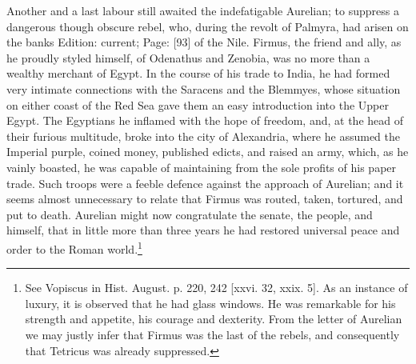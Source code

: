 Another and a last labour still awaited the indefatigable Aurelian; to suppress a dangerous though obscure rebel, who, during the revolt of Palmyra, had arisen on the banks Edition: current; Page: [93] of the Nile. Firmus, the friend and ally, as he proudly styled himself, of Odenathus and Zenobia, was no more than a wealthy merchant of Egypt. In the course of his trade to India, he had formed very intimate connections with the Saracens and the Blemmyes, whose situation on either coast of the Red Sea gave them an easy introduction into the Upper Egypt. The Egyptians he inflamed with the hope of freedom, and, at the head of their furious multitude, broke into the city of Alexandria, where he assumed the Imperial purple, coined money, published edicts, and raised an army, which, as he vainly boasted, he was capable of maintaining from the sole profits of his paper trade. Such troops were a feeble defence against the approach of Aurelian; and it seems almost unnecessary to relate that Firmus was routed, taken, tortured, and put to death. Aurelian might now congratulate the senate, the people, and himself, that in little more than three years he had restored universal peace and order to the Roman world.\footnote{See Vopiscus in Hist. August. p. 220, 242 [xxvi. 32, xxix. 5]. As an instance of luxury, it is observed that he had glass windows. He was remarkable for his strength and appetite, his courage and dexterity. From the letter of Aurelian we may justly infer that Firmus was the last of the rebels, and consequently that Tetricus was already suppressed.}

